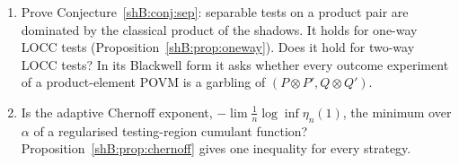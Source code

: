 \begin{enumerate}[leftmargin=1.5em]
structural reasons (Remark~\ref{shB:rem:LTscope}(ii) and the remark after Theorem~\ref{shB:thm:purepartner}), and no universal rooted kernel certifies \eqref{shB:eq:chiral}, so a proof must use the positivity of both pairs together and across different roots. Remark~\ref{shB:rem:LTscope}(iii) records a stronger one-variable convex-order statement, open beyond weakly sign-free pairs. The local supermodularity $(\mathrm S_\alpha)$ of Theorem~\ref{shB:thm:flow}, which implies the conjecture and held in every test, is a different route with the same first open cases.
\item Prove Conjecture~\ref{shB:conj:sep}: separable tests on a product pair are dominated by the classical product of the shadows. It holds for one-way LOCC tests (Proposition~\ref{shB:prop:oneway}). Does it hold for two-way LOCC tests? In its Blackwell form it asks whether every outcome experiment of a product-element POVM is a garbling of $(P\otimes P',Q\otimes Q')$.
\item Is the adaptive Chernoff exponent, $-\lim\frac1n\log\inf\eta_n(1)$, the minimum over $\alpha$ of a regularised testing-region cumulant function? Proposition~\ref{shB:prop:chernoff} gives one inequality for every strategy.
\end{enumerate}

\endgroup
